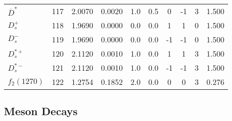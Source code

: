 \documentclass[a4paper,10pt]{article}
\begin{document}
\begin{tabular}{|lr|cccccccc|}
$\overline{D}^*$  & 117 & 2.0070 & 0.0020 &  1.0 &  0.5 &  0 & -1 &  3& 1.500\\
$D_s^+         $  & 118 & 1.9690 & 0.0000 &  0.0 &  0.0 &  1 &  1 &  0& 1.500\\
$D_s^-         $  & 119 & 1.9690 & 0.0000 &  0.0 &  0.0 & -1 & -1 &  0& 1.500\\
$D_s^{*+}      $  & 120 & 2.1120 & 0.0010 &  1.0 &  0.0 &  1 &  1 &  3& 1.500\\
$D_s^{*-}      $  & 121 & 2.1120 & 0.0010 &  1.0 &  0.0 & -1 & -1 &  3& 1.500\\
\hline
$f_2(1270)     $  & 122 & 1.2754 & 0.1852 &  2.0 &  0.0 &  0 &  0 &  3& 0.276\\
\hline
\end{tabular}

\subsection{Meson Decays}
\end{document}
